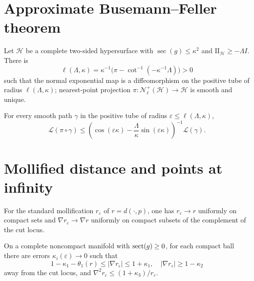 \section{Approximate Busemann--Feller theorem}

\begin{lemma}
\label{lem:chow-iii-i42-tubular-projection}
Let $\mathcal H$ be a complete two-sided hypersurface with
$\sec(g)\le\kappa^2$ and $\mathrm{II}_{\mathcal H}\ge-\Lambda I$.  There is
\[
\ell(\Lambda,\kappa)=\kappa^{-1}\bigl(\pi-\cot^{-1}(-\kappa^{-1}\Lambda)\bigr)>0
\]
such that the normal exponential map is a diffeomorphism on the positive
tube of radius $\ell(\Lambda,\kappa)$; nearest-point projection
$\pi:\mathcal N^+_{\ell}(\mathcal H)\to\mathcal H$ is smooth and unique.
\end{lemma}

\begin{theorem}
\label{thm:chow-iii-i44-approximate-busemann-feller}
For every smooth path $\gamma$ in the positive tube of radius
$\varepsilon\le\ell(\Lambda,\kappa)$,
\[
\mathcal L(\pi\circ\gamma)\le
\left(\cos(\varepsilon\kappa)-\frac\Lambda\kappa\sin(\varepsilon\kappa)\right)^{-1}
\mathcal L(\gamma).
\]
\end{theorem}

\section{Mollified distance and points at infinity}

\begin{lemma}
\label{lem:chow-iii-i45-mollified-distance}
For the standard mollification $r_\varepsilon$ of $r=d(\cdot,p)$, one has
$r_\varepsilon\to r$ uniformly on compact sets and
$\nabla r_\varepsilon\to\nabla r$ uniformly on compact subsets of the complement
of the cut locus.
\end{lemma}

\begin{lemma}
\label{lem:chow-iii-i47-mollified-derivatives}
On a complete noncompact manifold with $\operatorname{sect}(g)\ge0$, for each compact ball
there are errors $\kappa_i(\varepsilon)\to0$ such that
\[
1-\kappa_1-\theta_1(r)\le|\nabla r_\varepsilon|\le1+\kappa_1,
\quad |\nabla r_\varepsilon|\ge1-\kappa_2
\]
away from the cut locus, and
$\nabla^2r_\varepsilon\le(1+\kappa_3)/r_\varepsilon$.
\end{lemma}

